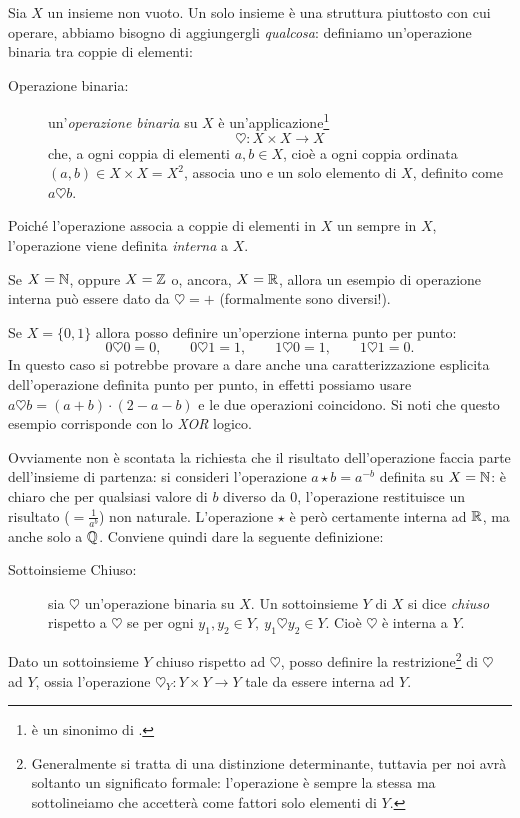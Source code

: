 		Sia $X$ un insieme non vuoto. Un solo insieme è una struttura piuttosto  con cui operare, abbiamo bisogno di aggiungergli \emph{qualcosa}: definiamo un'operazione binaria tra coppie di elementi:
		\begin{description}
			\item[Operazione binaria:] un'\emph{operazione binaria} su $X$ è un'applicazione\footnote{ è un sinonimo di .} \begin{equation*} 
				\heartsuit:X\times X\to X 
			\end{equation*} che, a ogni coppia di elementi $a, b \in X$, cioè a ogni coppia ordinata $(a, b) \in X\times X= X^2$, associa uno e un solo elemento di $X$, definito come $a\heartsuit b$.
		\end{description}
		Poiché l'operazione associa a coppie di elementi in $X$ un  sempre in $X$, l'operazione viene definita \emph{interna} a $X$.
		\begin{eg}
			Se $X=\mathbb{N}$, oppure $X=\mathbb{Z}$ o, ancora, $X=\mathbb{R}$, allora un esempio di operazione interna può essere dato da $\heartsuit=+$ (formalmente sono \virg{$+$} diversi!).
		\end{eg}
		\begin{eg}
			Se $X=\{0,1\}$ allora posso definire un'operzione interna punto per punto:  \begin{equation*} 
				0\heartsuit0=0, \qquad 0\heartsuit1=1, \qquad 1\heartsuit0=1, \qquad 1\heartsuit1=0.
			\end{equation*} 
		In questo caso si potrebbe provare a dare anche una caratterizzazione esplicita dell'operazione definita punto per punto, in effetti possiamo usare $a\heartsuit b=(a+b)\cdot(2-a-b)$ e le due operazioni coincidono. Si noti che questo esempio corrisponde con lo \textit{XOR} logico.
		\end{eg}
		Ovviamente non è scontata la richiesta che il risultato dell'operazione faccia parte dell'insieme di partenza: si consideri l'operazione $a\star b=a^{-b}$ definita su $X=\mathbb{N}$: è chiaro che per qualsiasi valore di $b$ diverso da $0$, l'operazione restituisce un risultato ($=\frac{1}{a^b}$) non naturale. L'operazione $\star$ è però certamente interna ad $\mathbb{R}$, ma anche solo a $\mathbb{Q}$. Conviene quindi dare la seguente definizione:
		\begin{description}
			\item[Sottoinsieme Chiuso:] sia $\heartsuit$ un'operazione binaria su $X$. Un sottoinsieme $Y$ di $X$ si dice \emph{chiuso} rispetto a $\heartsuit$ se per ogni $y_1,y_2\in Y,\ y_1\heartsuit y_2\in Y$. Cioè $\heartsuit$ è interna a $Y$.
		\end{description}
		Dato un sottoinsieme $Y$ chiuso rispetto ad $\heartsuit$, posso definire la restrizione\footnote{Generalmente si tratta di una distinzione determinante, tuttavia per noi avrà soltanto un significato formale: l'operazione è sempre la stessa ma sottolineiamo che accetterà come fattori solo elementi di $Y$.} di $\heartsuit$ ad $Y$, ossia l'operazione $\heartsuit_{Y}:Y\times Y\to Y$ tale da essere interna ad $Y$.
		
